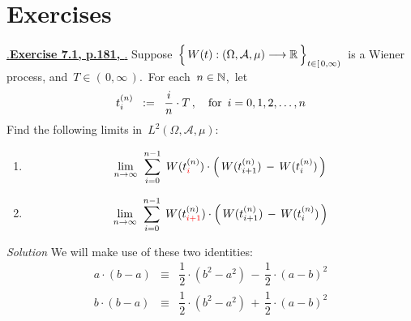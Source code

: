 

\section{Exercises}
\setcounter{theorem}{0}
\setcounter{equation}{0}


\renewcommand{\theenumi}{\roman{enumi}}
\renewcommand{\labelenumi}{\textnormal{(\theenumi)}$\;\;$}


\noindent
\underline{{\color{white}.}\textbf{Exercise 7.1, p.181, \cite{Brzezniak1999}}{\color{white}.}}
\vskip 0.3cm
\noindent
Suppose
\,$\left\{\,\overset{{\color{white}.}}{W}(t) : (\Omega,\mathcal{A},\mu) \longrightarrow \Re \,\right\}_{t\in[\,0,\infty)}$\,
is a Wiener process,
and \,$T \in (\,0,\infty\,)$.\,
For each \,$n \in \mathbb{N}$,\, let
\begin{equation*}
t^{(n)}_{i} \;\; := \;\; \dfrac{i}{n}\cdot T\,,
\quad
\textnormal{for \,$i = 0,1,2,\ldots,n$}
\end{equation*}
Find the following limits in \,$L^{2}(\Omega,\mathcal{A},\mu)$:
\begin{enumerate}
\item
	\begin{equation*}
	\underset{n\rightarrow\infty}{\lim}\;\;
	\overset{n-1}{\underset{i=0}{\sum}}\;\,
	W(t^{(n)}_{{\color{red}i}})\cdot\left(\,W(t^{(n)}_{i+1}) \,-\, W(t^{(n)}_{i})\,\right)
	\end{equation*}
\item
	\begin{equation*}
	\underset{n\rightarrow\infty}{\lim}\;\;
	\overset{n-1}{\underset{i=0}{\sum}}\;\,
	W(t^{(n)}_{{\color{red}i+1}})\cdot\left(\,W(t^{(n)}_{i+1}) \,-\, W(t^{(n)}_{i})\,\right)
	\end{equation*}
\end{enumerate}
\textit{Solution}\quad
We will make use of these two identities:
\begin{eqnarray}
\label{FirstIdentity}
a\cdot(b-a)
& \equiv &
	\dfrac{1}{2}\cdot(b^{2}-a^{2}) \, - \, \dfrac{1}{2}\cdot(a-b)^{2}
\\
\label{SecondIdentity}
b\cdot(b-a)
& \equiv &
	\dfrac{1}{2}\cdot(b^{2}-a^{2}) \, + \, \dfrac{1}{2}\cdot(a-b)^{2}
\end{eqnarray}
